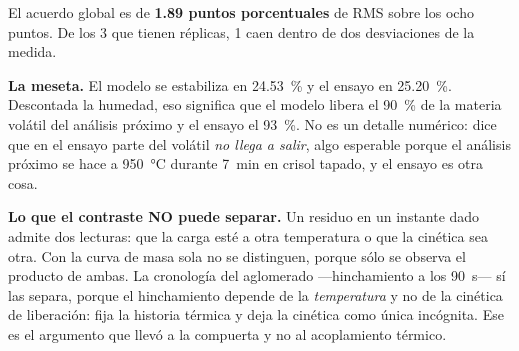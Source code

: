 El acuerdo global es de \textbf{1.89 puntos porcentuales} de RMS sobre los ocho puntos. De los 3 que tienen réplicas, 1 caen dentro de dos desviaciones de la medida.

\textbf{La meseta.} El modelo se estabiliza en \qty{24.53}{\percent} y el ensayo en \qty{25.20}{\percent}. Descontada la humedad, eso significa que el modelo libera el \qty{90}{\percent} de la materia volátil del análisis próximo y el ensayo el \qty{93}{\percent}. No es un detalle numérico: dice que en el ensayo parte del volátil \emph{no llega a salir}, algo esperable porque el análisis próximo se hace a \SI{950}{\celsius} durante \SI{7}{\minute} en crisol tapado, y el ensayo es otra cosa.

\textbf{Lo que el contraste NO puede separar.} Un residuo en un instante dado admite dos lecturas: que la carga esté a otra temperatura o que la cinética sea otra. Con la curva de masa sola no se distinguen, porque sólo se observa el producto de ambas. La cronología del aglomerado —hinchamiento a los \SI{90}{\second}— sí las separa, porque el hinchamiento depende de la \emph{temperatura} y no de la cinética de liberación: fija la historia térmica y deja la cinética como única incógnita. Ese es el argumento que llevó a la compuerta y no al acoplamiento térmico.
